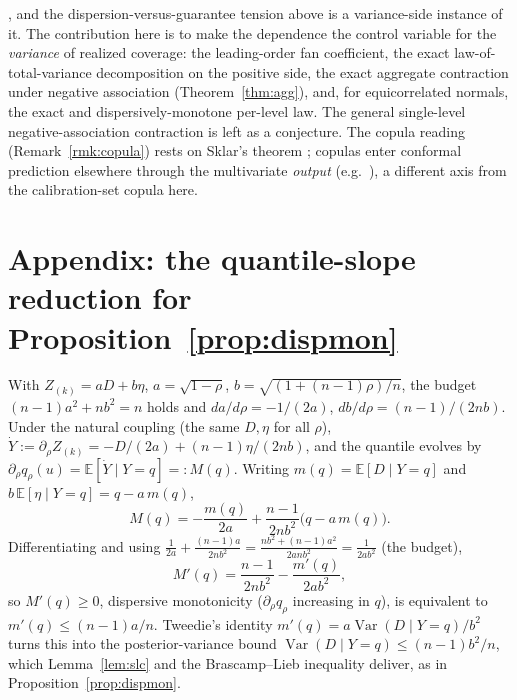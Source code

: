 \documentclass[11pt]{article}
\begin{document}
\citet{deliu2025}, and the dispersion-versus-guarantee tension above is a variance-side instance of it.
The contribution here is to
make the dependence the control variable for the \emph{variance} of realized coverage: the
leading-order fan coefficient, the exact law-of-total-variance decomposition on the positive side, the
exact aggregate contraction under negative association (Theorem~\ref{thm:agg}), and, for equicorrelated
normals, the exact and dispersively-monotone per-level law. The general single-level negative-association
contraction is left as a conjecture. The copula reading (Remark~\ref{rmk:copula}) rests on Sklar's
theorem \citep{sklar1959,nelsen2006}; copulas enter conformal prediction elsewhere through the
multivariate \emph{output} (e.g.\ \citealp{sunyu2024}), a different axis from the calibration-set
copula here.

\section*{Appendix: the quantile-slope reduction for Proposition~\ref{prop:dispmon}}

With $Z_{(k)}=aD+b\eta$, $a=\sqrt{1-\rho}$, $b=\sqrt{(1+(n-1)\rho)/n}$, the budget
$(n-1)a^2+nb^2=n$ holds and $da/d\rho=-1/(2a)$, $db/d\rho=(n-1)/(2nb)$. Under the natural coupling
(the same $D,\eta$ for all $\rho$), $\dot Y:=\partial_\rho Z_{(k)}=-D/(2a)+(n-1)\eta/(2nb)$, and the
quantile evolves by $\partial_\rho q_\rho(u)=\mathbb E[\dot Y\mid Y=q]=:M(q)$. Writing
$m(q)=\mathbb E[D\mid Y=q]$ and $b\,\mathbb E[\eta\mid Y=q]=q-a\,m(q)$,
\begin{equation}
M(q)=-\frac{m(q)}{2a}+\frac{n-1}{2nb^2}\big(q-a\,m(q)\big).
\end{equation}
Differentiating and using $\tfrac1{2a}+\tfrac{(n-1)a}{2nb^2}=\tfrac{nb^2+(n-1)a^2}{2anb^2}=\tfrac1{2ab^2}$
(the budget),
\begin{equation}
M'(q)=\frac{n-1}{2nb^2}-\frac{m'(q)}{2ab^2},
\end{equation}
so $M'(q)\ge0$, dispersive monotonicity ($\partial_\rho q_\rho$ increasing in $q$), is equivalent to
$m'(q)\le (n-1)a/n$. Tweedie's identity $m'(q)=a\operatorname{Var}(D\mid Y=q)/b^2$ turns this into the
posterior-variance bound $\operatorname{Var}(D\mid Y=q)\le (n-1)b^2/n$, which Lemma~\ref{lem:slc} and
the Brascamp--Lieb inequality deliver, as in Proposition~\ref{prop:dispmon}.
\end{document}
